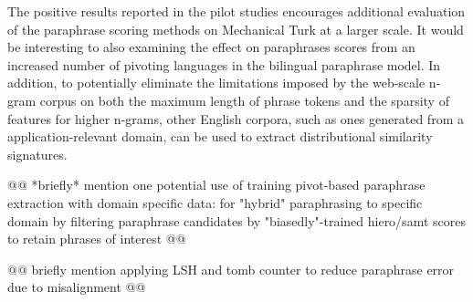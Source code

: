 \documentclass[11pt]{article}
\begin{document}
The positive results reported in the pilot studies encourages additional evaluation of the paraphrase scoring methods on Mechanical Turk at a larger scale. It would be interesting to also examining the effect on paraphrases scores from an increased number of pivoting languages in the bilingual paraphrase model. In addition, to potentially eliminate the limitations imposed by the web-scale n-gram corpus on both the maximum length of phrase tokens and the sparsity of features for higher n-grams, other English corpora, such as ones generated from a application-relevant domain, can be used to extract distributional similarity signatures.

@@ *briefly* mention one potential use of training pivot-based paraphrase extraction with domain specific data: for "hybrid" paraphrasing to specific domain by filtering paraphrase candidates by "biasedly"-trained hiero/samt scores to retain phrases of interest @@

@@ briefly mention applying LSH and tomb counter to reduce paraphrase error due to misalignment @@



\end{document}

